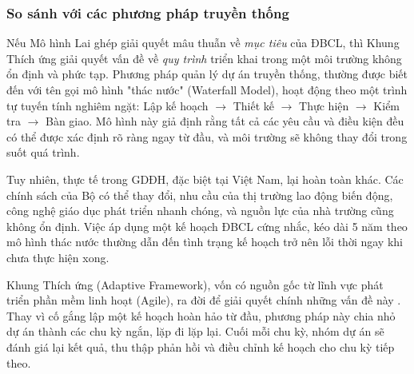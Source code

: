\documentclass[12pt, a4paper, openany]{report}
\begin{document}
\subsubsection{So sánh với các phương pháp truyền thống}
Nếu Mô hình Lai ghép giải quyết mâu thuẫn về \textit{mục tiêu} của ĐBCL, thì Khung Thích ứng giải quyết vấn đề về \textit{quy trình} triển khai trong một môi trường không ổn định và phức tạp. Phương pháp quản lý dự án truyền thống, thường được biết đến với tên gọi mô hình "thác nước" (Waterfall Model), hoạt động theo một trình tự tuyến tính nghiêm ngặt: Lập kế hoạch $\rightarrow$ Thiết kế $\rightarrow$ Thực hiện $\rightarrow$ Kiểm tra $\rightarrow$ Bàn giao. Mô hình này giả định rằng tất cả các yêu cầu và điều kiện đều có thể được xác định rõ ràng ngay từ đầu, và môi trường sẽ không thay đổi trong suốt quá trình.

Tuy nhiên, thực tế trong GDĐH, đặc biệt tại Việt Nam, lại hoàn toàn khác. Các chính sách của Bộ có thể thay đổi, nhu cầu của thị trường lao động biến động, công nghệ giáo dục phát triển nhanh chóng, và nguồn lực của nhà trường cũng không ổn định. Việc áp dụng một kế hoạch ĐBCL cứng nhắc, kéo dài 5 năm theo mô hình thác nước thường dẫn đến tình trạng kế hoạch trở nên lỗi thời ngay khi chưa thực hiện xong.

Khung Thích ứng (Adaptive Framework), vốn có nguồn gốc từ lĩnh vực phát triển phần mềm linh hoạt (Agile), ra đời để giải quyết chính những vấn đề này \cite{Wysocki2009}. Thay vì cố gắng lập một kế hoạch hoàn hảo từ đầu, phương pháp này chia nhỏ dự án thành các chu kỳ ngắn, lặp đi lặp lại. Cuối mỗi chu kỳ, nhóm dự án sẽ đánh giá lại kết quả, thu thập phản hồi và điều chỉnh kế hoạch cho chu kỳ tiếp theo.
\end{document}

